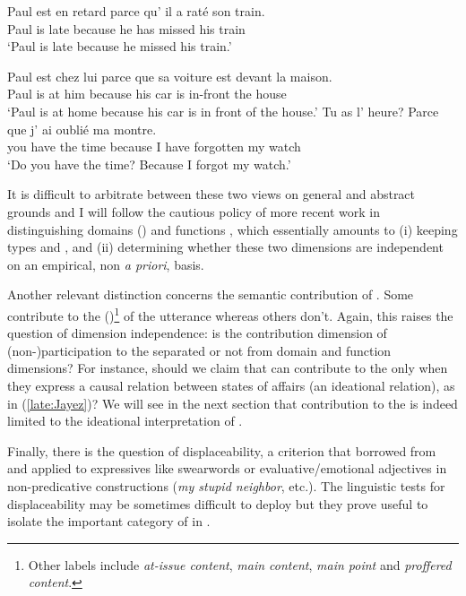 \documentclass[output=paper,colorlinks,citecolor=brown]{langscibook}
\begin{document}
	\ea
	\label{late:Jayez}
	\gll Paul est {en retard} {parce qu'} il a raté son train.\\
	Paul is late because he has missed his train\\
 \glt `Paul is late because he missed his train.'
	\z

\ea
\label{car:Jayez}
\gll Paul est chez lui {parce que} sa voiture est devant la maison.\\
Paul is at him because his car is {in-front} the house\\
\glt `Paul is at home because his car is in front of the house.'
\z
\ea
\label{watch:Jayez}
\gll Tu as l' heure? {Parce que} j' ai oublié ma montre.\\
you have the time because I have forgotten my watch\\
\glt `Do you have the time? Because I forgot my watch.'
\z

It is difficult to arbitrate between these two views on general and abstract grounds and I will follow the cautious policy of more recent work in distinguishing domains () and functions \citep{Crible:2018,CribleDeGand:2019}, which essentially amounts to (i) keeping  types and , and (ii) determining whether these two dimensions are independent on an empirical, non \textit{a priori}, basis.

Another relevant distinction concerns the semantic contribution of . Some  contribute to the  ()\footnote{Other labels include \textit{at-issue content}, \textit{main content}, \textit{main point} and \textit{proffered content}.} of the utterance whereas others don't. Again, this raises the question of dimension independence: is the contribution dimension of (non-)participation to the  separated or not from domain and function dimensions? For instance, should we claim that  can contribute to the  only when they express a causal relation between states of affairs (an ideational relation), as in (\ref{late:Jayez})?  We will see in the next section that contribution to the  is indeed limited to the ideational interpretation of .

Finally, there is the question of displaceability, a criterion that \citet{Potts:2007} borrowed from \citet{Hockett:1960} and applied to expressives like swearwords or evaluative/emotional adjectives in non-predicative constructions (\textit{my stupid neighbor}, etc.). The linguistic tests for displaceability may be sometimes difficult to deploy but they prove useful to isolate the important category of  \citep{Dargnat:2024} in .
\end{document}
